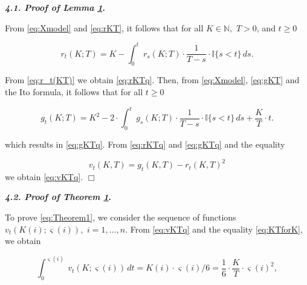 








\textbf{\emph{4.1. Proof of Lemma \hyperlink{b:l1}{1}}.}

From \eqref{eq:Xmodel} and \eqref{eq:rKT}, it follows that for all $K \in \mathbb{N},$ $T>0$, and $t \geq 0$

\begin{equation}\label{eq:r_t(KT)}

	{r_t}(K; T) = K - \int_{0}^{t}\!\ {r_s}(K; T) \cdot{\frac{1}{T - s}}\cdot \mathbb{I}\{s< t\}\,ds.

\end{equation}

From \eqref{eq:r_t(KT)} we obtain  \eqref{eq:rKTq}. Then, from \eqref{eq:Xmodel}, \eqref{eq:gKT} and the Ito formula, it follows that for all $t \geq 0$

\begin{equation}\label{eq:g_t(KT)}

	{g_t}(K; T) = K^2 - 2 \cdot \int_{0}^{t}\!\ {g_s}(K; T) \cdot{\frac{1}{T - s}}\cdot \mathbb{I}\{s< t\}\,ds + \frac{K}{T}\cdot t.

\end{equation}

which results in \eqref{eq:gKTq}. From \eqref{eq:rKTq} and \eqref{eq:gKTq} and the equality 

$${v_t}(K, T) = {g_t}(K, T) - {r_t}(K, T)^2$$ we obtain \eqref{eq:vKTq}. \hfill $\Box$



\smallskip






\textbf{\emph{4.2. Proof of Theorem \hyperlink{b:Th1}{1}}.}

To prove \eqref{eq:Theorem1}, we consider the sequence of func\-tions ${v_t}(K(i); \varsigma (i) ),$ $ i = 1, \dotsc , n$. From \eqref{eq:vKTq} and the equality \eqref{eq:KTforK}, we obtain

\begin{equation}\label{eq:vt(KS)}

\int_{0}^{{\varsigma}(i)}\!\ {v_t}(K; {\varsigma}(i)) \,dt = K(i)\cdot {\varsigma}(i) / 6 = {\frac{1}{6}}\cdot{\frac{K}{T}}\cdot {{\varsigma}(i)}^2,

\end{equation}

